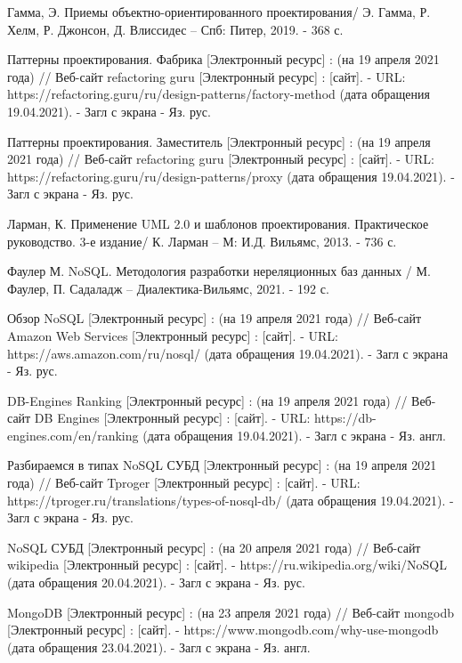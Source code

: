 \documentclass[14pt]{extreport}
\begin{document}
\begin{thebibliography}{9}
  Гамма, Э. Приемы объектно-ориентированного проектирования/ Э. Гамма, Р. Хелм, Р. Джонсон, Д. Влиссидес -- Спб: Питер, 2019. - 368 с.
  
  Паттерны проектирования. Фабрика [Электронный ресурс] : (на 19 апреля 2021 года) // Веб-сайт refactoring guru [Электронный ресурс] : [сайт]. - URL: https://refactoring.guru/ru/design-patterns/factory-method (дата обращения 19.04.2021). - Загл с экрана - Яз. рус.

Паттерны проектирования. Заместитель [Электронный ресурс] : (на 19 апреля 2021 года) // Веб-сайт refactoring guru [Электронный ресурс] : [сайт]. - URL: https://refactoring.guru/ru/design-patterns/proxy (дата обращения 19.04.2021). - Загл с экрана - Яз. рус.  

  Ларман, К. Применение UML 2.0 и шаблонов проектирования. Практическое руководство. 3-е издание/ К. Ларман -- М: И.Д. Вильямс, 2013. - 736 с.
  
     Фаулер М. NoSQL. Методология разработки нереляционных баз данных / М. Фаулер, П. Садаладж -- Диалектика-Вильямс, 2021. - 192 с.
     
Обзор NoSQL [Электронный ресурс] : (на 19 апреля 2021 года) // Веб-сайт Amazon Web Services [Электронный ресурс] : [сайт]. - URL: https://aws.amazon.com/ru/nosql/ (дата обращения 19.04.2021). - Загл с экрана - Яз. рус.

DB-Engines Ranking [Электронный ресурс] : (на 19 апреля 2021 года) // Веб-сайт DB Engines [Электронный ресурс] : [сайт]. - URL: https://db-engines.com/en/ranking (дата обращения 19.04.2021). - Загл с экрана - Яз. англ.



Разбираемся в типах NoSQL СУБД [Электронный ресурс] : (на 19 апреля 2021 года) // Веб-сайт Tproger [Электронный ресурс] : [сайт]. - URL: https://tproger.ru/translations/types-of-nosql-db/ (дата обращения 19.04.2021). - Загл с экрана - Яз. рус.

NoSQL СУБД [Электронный ресурс] : (на 20 апреля 2021 года) // Веб-сайт wikipedia [Электронный ресурс] : [сайт]. - https://ru.wikipedia.org/wiki/NoSQL (дата обращения 20.04.2021). - Загл с экрана - Яз. рус.


MongoDB [Электронный ресурс] : (на 23 апреля 2021 года) // Веб-сайт mongodb [Электронный ресурс] : [сайт]. - https://www.mongodb.com/why-use-mongodb (дата обращения 23.04.2021). - Загл с экрана - Яз. англ.


\end{thebibliography}
\end{document}
